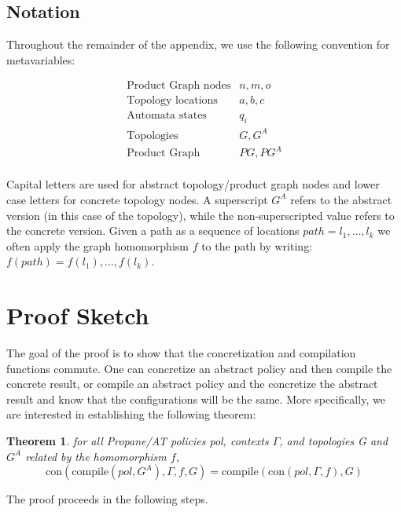 \documentclass[twocolumn, openany]{sig-alternate-10pt}
\newcommand{\sysname}{{\small \sf Propane/AT}\xspace}
\newcommand{\Con}{\mathrm{con}}
\newcommand{\Compile}{\ensuremath{\mathrm{compile}}}
\newtheorem{thm}{Theorem}
\begin{document}
\subsection{Notation}

Throughout the remainder of the appendix, we use the following convention for metavariables:

\[ \begin{array}{ll}
  \text{Product Graph nodes} & n,m,o \\
  \text{Topology locations} & a,b,c \\
  \text{Automata states} & q_i \\
  \text{Topologies} & G, G^A \\
  \text{Product Graph} & PG, PG^A \\
\end{array} \]

Capital letters are used for abstract topology/product graph nodes and lower case letters for concrete topology nodes. A superscript $G^A$ refers to the abstract version (in this case of the topology), while the non-superscripted value refers to the concrete version. Given a path as a sequence of locations $path = l_1, \dots, l_k$ we often apply the graph homomorphism $f$ to the path by writing: $f(path) = f(l_1), \dots, f(l_k)$.


\newpage

\section{Proof Sketch}
\vspace{1em}

The goal of the proof is to show that the concretization and compilation functions commute. One can concretize an abstract policy and then compile the concrete result, or compile an abstract policy and the concretize the abstract result and know that the configurations will be the same. More specifically, we are interested in establishing the following theorem:

\begin{thm}
  for all \sysname policies pol, contexts $\Gamma$, and topologies G and $G^A$ related by the homomorphism $f$, 
  $$\Con(\Compile(pol,G^A),\Gamma,f,G) = \Compile(\Con(pol,\Gamma,f), G)$$
\end{thm}

\noindent
The proof proceeds in the following steps. 
\end{document}
